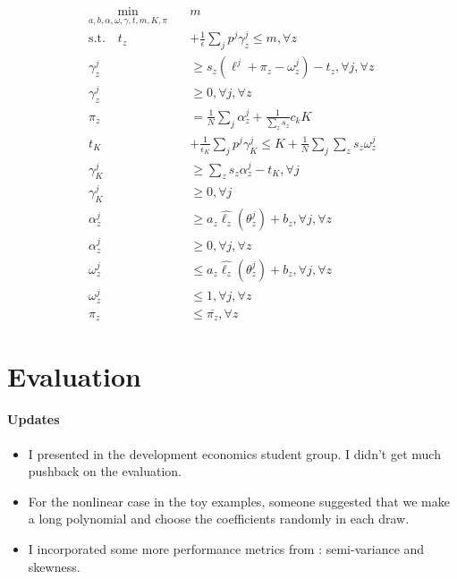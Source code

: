 \documentclass[11pt]{article}
\begin{document}
  \begin{align}
    \min_{a,b,\alpha,\omega,\gamma,t,m,K,\pi} \quad & m\\
    \text{s.t.} \quad t_z &+ \frac{1}{\epsilon} \sum_j p^j \gamma_z^j \leq m, \forall z\\
    \gamma_z^j &\geq s_z \left (\ell^j + \pi_z - \omega^j_z \right ) -t_z, \forall j, \forall z \\
    \gamma_z^j &\geq 0, \forall j, \forall z\\
    \pi_z &= \frac{1}{N} \sum_j \alpha^j_z + \frac{1}{\sum_z s_z} c_k K\\
    t_K &+ \frac{1}{\epsilon_K} \sum_j p^j \gamma_K^j \leq K+ \frac{1}{N}\sum_j \sum_z s_z \omega^j_z\\
    \gamma_K^j &\geq \sum_z s_z \alpha^j_z -t_K, \forall j \\
    \gamma_K^j &\geq 0, \forall j\\
    \alpha^j_z &\geq a_z \hat{\ell_z}(\theta^j_z) + b_z, \forall j, \forall z\\
    \alpha^j_z &\geq 0, \forall j, \forall z\\
    \omega^j_z &\leq a_z \hat{\ell_z}(\theta^j_z) + b_z, \forall j, \forall z\\
    \omega^j_z &\leq 1, \forall j, \forall z\\
    \pi_z &\leq \overline{\pi_z}, \forall z
  \end{align}

\section{Evaluation}
\paragraph*{Updates}
\begin{itemize}
    \item I presented in the development economics student group. I didn't get much pushback on the evaluation. 
    \item For the nonlinear case in the toy examples, someone suggested that we make a long polynomial and choose the coefficients randomly in each draw. 
    \item I incorporated some more performance metrics from \cite{jensen2016index}: semi-variance and skewness.
\end{itemize}
\end{document}
